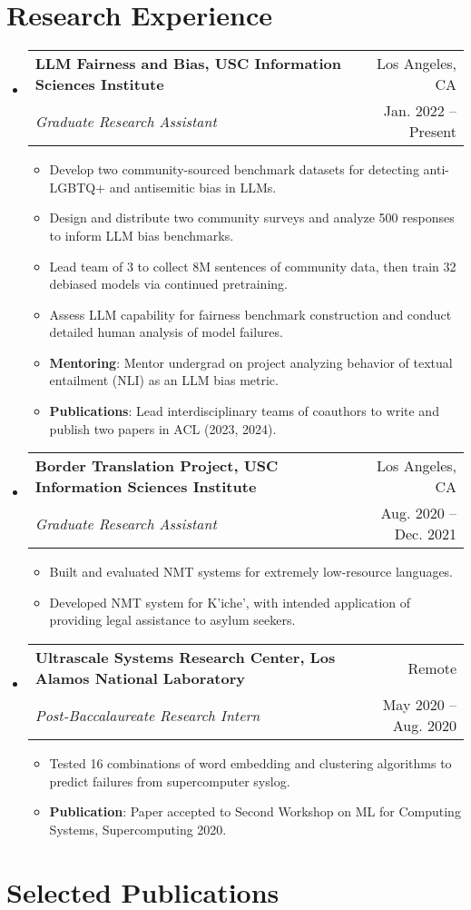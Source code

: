 \documentclass[letterpaper,11pt]{article}
\makeatletter
\newcommand{\resumeItemWithHeader}[2]{
  \item\small{
    \textbf{#1}{: #2 \vspace{-2pt}}
  }
}
\newcommand{\resumeItem}[1]{
  \item\small{
  {#1 \vspace{-2pt}}
  }
}
\newcommand{\resumeSubheading}[4]{
  \vspace{-1pt} \item
    \begin{tabular*}{0.97\textwidth}{l@{\extracolsep{\fill}}r}
      \textbf{#1} & #2 \\
      \textit{\small#3} & \small #4 \\
      
    \end{tabular*}\vspace{-5pt}
}
\newcommand{\resumeSubHeadingListStart}{\begin{itemize}[label={}, leftmargin=*]}
\newcommand{\resumeSubHeadingListEnd}{\end{itemize}}
\newcommand{\resumeItemListStart}{\begin{itemize}}
\newcommand{\resumeItemListEnd}{\end{itemize}\vspace{-5pt}}
\makeatother
\begin{document}
\section{Research Experience}
\resumeSubHeadingListStart
    \resumeSubheading
      {LLM Fairness and Bias, USC Information Sciences Institute}{Los Angeles, CA}
      {Graduate Research Assistant}{Jan. 2022 -- Present}
      \resumeItemListStart
      \resumeItem{Develop two community-sourced benchmark datasets for detecting anti-LGBTQ+ and antisemitic bias in LLMs.}
      \resumeItem{Design and distribute two community surveys and analyze 500 responses to inform LLM bias benchmarks.}
      \resumeItem{Lead team of 3 to collect 8M sentences of community data, then train 32 debiased models via continued pretraining.}
      \resumeItem{Assess LLM capability for  fairness benchmark construction and conduct detailed human analysis of model failures.}
      \resumeItemWithHeader{Mentoring}{Mentor undergrad on project analyzing behavior of textual entailment (NLI) as an LLM bias metric.}
      \resumeItemWithHeader{Publications}{Lead interdisciplinary teams of coauthors to write and publish two papers in ACL (2023, 2024).}
      \resumeItemListEnd

    \resumeSubheading
      {Border Translation Project, USC Information Sciences Institute}{Los Angeles, CA}
      {Graduate Research Assistant}{Aug. 2020 -- Dec. 2021}
      \resumeItemListStart
      \resumeItem{Built and evaluated NMT systems for extremely low-resource languages.}
      \resumeItem{Developed NMT system for K'iche', with intended application of providing legal assistance to asylum seekers.}
      \resumeItemListEnd

    \resumeSubheading
      {Ultrascale Systems Research Center, Los Alamos National Laboratory}{Remote}
      {Post-Baccalaureate Research Intern}{May 2020 -- Aug. 2020}
      \resumeItemListStart
      \resumeItem{Tested 16 combinations of word embedding and clustering algorithms to predict failures from supercomputer syslog.} 
      \resumeItemWithHeader{Publication}{Paper accepted to Second Workshop on ML for Computing Systems, Supercomputing 2020.}
      \resumeItemListEnd
      
    \resumeSubHeadingListEnd
\section{Selected Publications}
\begin{refsection}
\nocite{*}
\printbibliography[heading=none]
\end{refsection}
\end{document}
